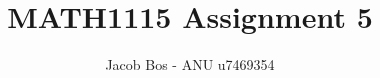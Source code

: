 \documentclass[11pt]{article}
\title{MATH1115 Assignment 5 }
\author{Jacob Bos - ANU u7469354}
\begin{document}
\begin{small}
\maketitle
\end{small}



	
\end{document}
